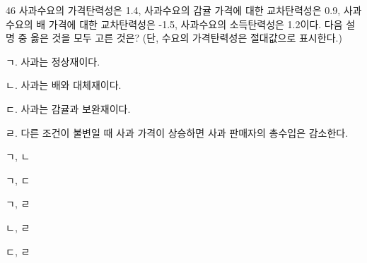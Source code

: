 \begin{question}{46}
사과수요의 가격탄력성은 1.4, 사과수요의 감귤 가격에 대한 교차탄력성은 0.9, 사과수요의 배 가격에 대한 교차탄력성은 -1.5, 사과수요의 소득탄력성은 1.2이다. 다음 설명 중 옳은 것을 모두 고른 것은? (단, 수요의 가격탄력성은 절대값으로 표시한다.)
\begin{framedtext}
ㄱ. 사과는 정상재이다. \par
ㄴ. 사과는 배와 대체재이다. \par
ㄷ. 사과는 감귤과 보완재이다. \par
ㄹ. 다른 조건이 불변일 때 사과 가격이 상승하면 사과 판매자의 총수입은 감소한다.
\end{framedtext}
\begin{choices}
  \item ㄱ, ㄴ
  \item ㄱ, ㄷ
  \item ㄱ, ㄹ
  \item ㄴ, ㄹ
  \item ㄷ, ㄹ
\end{choices}
\end{question}
